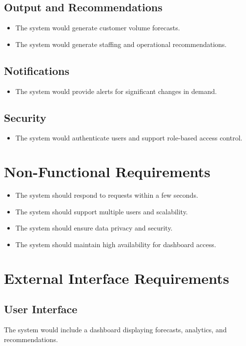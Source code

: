 \documentclass[12pt]{report}
\begin{document}
\subsection{Output and Recommendations}
\begin{itemize}
    \item The system would generate customer volume forecasts.
    \item The system would generate staffing and operational recommendations.
\end{itemize}

\subsection{Notifications}
\begin{itemize}
    \item The system would provide alerts for significant changes in demand.
\end{itemize}

\subsection{Security}
\begin{itemize}
    \item The system would authenticate users and support role-based access control.
\end{itemize}

\section{Non-Functional Requirements}
\begin{itemize}
    \item The system should respond to requests within a few seconds.
    \item The system should support multiple users and scalability.
    \item The system should ensure data privacy and security.
    \item The system should maintain high availability for dashboard access.
\end{itemize}

\section{External Interface Requirements}

\subsection{User Interface}
The system would include a dashboard displaying forecasts, analytics, and recommendations.
\end{document}

